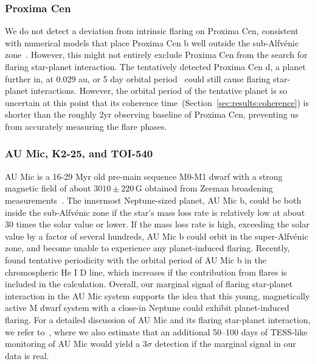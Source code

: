 \documentclass[twocolumn]{aastex631}
\begin{document}
\subsubsection{Proxima Cen}
\label{sec:results:individualstars:proxima}
We do not detect a deviation from intrinsic flaring on Proxima Cen, consistent with numerical models that place Proxima Cen b well outside the sub-Alfv\'enic zone~\citep{kavanagh2021planetinduced}. However, this might not entirely exclude Proxima Cen from the search for flaring star-planet interaction. The tentatively detected Proxima Cen d, a planet further in, at 0.029 au, or 5 day orbital period~\citep{faria2022candidate, artigau2022linebyline} could still cause flaring star-planet interactions. However, the orbital period of the tentative planet is so uncertain at this point that its coherence time~(Section~\ref{sec:results:coherence}) is shorter than the roughly 2yr observing baseline of Proxima Cen, preventing us from accurately measuring the flare phases. 


\subsubsection{AU Mic, K2-25, and TOI-540}
\label{sec:results:individualstars:aumic}

AU Mic is a 16-29 Myr old pre-main sequence M0-M1 dwarf with a strong magnetic field of about $3010\pm220\,$G obtained from Zeeman broadening measurements~\citep{reiners2022magnetism}. The innermost Neptune-sized planet, AU Mic b, could be both inside the sub-Alfv\'enic zone if the star's mass loss rate is relatively low at about 30 times the solar value or lower. If the mass loss rate is high, exceeding the solar value by a factor of several hundreds, AU Mic b could orbit in the super-Alfv\'enic zone, and become unable to experience any planet-induced flaring. Recently, \citet{klein2022one} found tentative periodicity with the orbital period of AU Mic b in the chromospheric He I D line, which increases if the contribution from flares is included in the calculation. Overall, our marginal signal of flaring star-planet interaction in the AU Mic system supports the idea that this young, magnetically active M dwarf system with a close-in Neptune could exhibit planet-induced flaring.
For a detailed discussion of AU Mic and its flaring star-planet interaction, we refer to~\cite{ilin2022searching}, where we also estimate that an additional 50–100 days of TESS-like monitoring of AU Mic would yield a $3\sigma$ detection if the marginal signal in our data is real.
 
\end{document}
